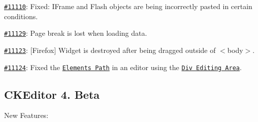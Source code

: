 {\begin{DoxyItemize}
\item \href{http://dev.ckeditor.com/ticket/11110}{\tt \#11110}\+: Fixed\+: I\+Frame and Flash objects are being incorrectly pasted in certain conditions.
\item \href{http://dev.ckeditor.com/ticket/11129}{\tt \#11129}\+: Page break is lost when loading data.
\item \href{http://dev.ckeditor.com/ticket/11123}{\tt \#11123}\+: \mbox{[}Firefox\mbox{]} Widget is destroyed after being dragged outside of {\ttfamily $<$body$>$}.
\item \href{http://dev.ckeditor.com/ticket/11124}{\tt \#11124}\+: Fixed the \href{http://ckeditor.com/addon/elementspath}{\tt Elements Path} in an editor using the \href{http://ckeditor.com/addon/divarea}{\tt Div Editing Area}.
\end{DoxyItemize}}

{\ttfamily \subsection*{C\+K\+Editor 4. Beta}}

{\ttfamily }

{\ttfamily New Features\+:}


